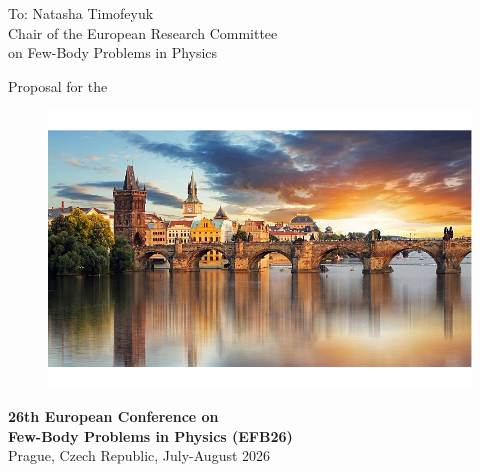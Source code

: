\documentclass[12pt]{extarticle}
\begin{document}
\color{C0}


\noindent
To: Natasha Timofeyuk \\
Chair of the European Research Committee \\
on Few-Body Problems in Physics

\bigskip
\noindent
\doublespacing
{ \Large Proposal for the}

\begin{figure}[h]
  \centering
  \includegraphics[width=1.0 \textwidth]{Prague_foto_cut.jpg}
\end{figure}
%

\vspace{-1cm}
\begin{center}
\noindent
\doublespacing
{\color{C2}\selectfont%
  \LARGE \bf  26th  European Conference on \\[2mm ] Few-Body Problems in Physics (EFB26)} \\[2mm]
{\Large Prague, Czech Republic, July-August 2026%
}
\end{center}

\vspace{1cm}

\onehalfspacing
\end{document}
